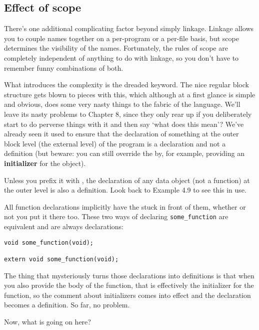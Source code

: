  \subsection{Effect of scope}
   

   There's one additional complicating factor beyond simply linkage.
    Linkage allows you to couple names together on a per-program or a
    per-file basis, but scope determines the visibility of the names.
    Fortunately, the rules of scope are completely independent of anything
    to do with linkage, so you don't have to remember funny combinations of
    both.


   What introduces the complexity is the dreaded \extern{} keyword. The nice
    regular block structure gets blown to pieces with this, which although
    at a first glance is simple and obvious, does some very nasty things to
    the fabric of the language. We'll leave its nasty problems to
    Chapter 8, since they only rear up if you deliberately
    start to do perverse things with it and then say `what does this
    mean'? We've already seen it used to ensure that the declaration of
    something at the outer block level (the external level) of the program
    is a declaration and not a definition (but beware: you can still
    override the \extern{} by, for example, providing an
    \textbf{initializer} for the object).


   Unless you prefix it with \extern, the declaration of any
    data object (not a function) at the outer level is also a definition.
    Look back to Example 4.9 to see this in use.


   All function declarations implicitly have the \extern{}
    stuck in front of them, whether or not you put it there too. These two
    ways of declaring \texttt{some\_function} are equivalent and are
    always declarations:

\begin{Verbatim}
void some_function(void);

extern void some_function(void);
\end{Verbatim}

   The thing that mysteriously turns those declarations into definitions
    is that when you also provide the body of the function, that is
    effectively the initializer for the function, so the comment about
    initializers comes into effect and the declaration becomes a definition.
    So far, no problem.


   Now, what is going on here?

